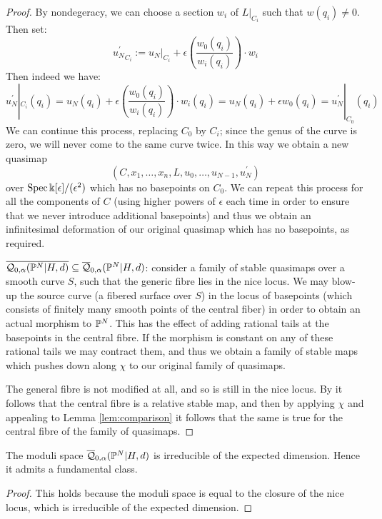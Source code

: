\begin{proof}
By nondegeracy, we can choose a section $w_i$ of $L|_{C_i}$ such that $w(q_i) \neq 0$. Then set:
\begin{equation*} {u_N^\prime}_{C_i} := {u_N}|_{C_i} + \epsilon \left( \frac{w_0(q_i)}{w_i(q_i)} \right) \cdot w_i \end{equation*}
Then indeed we have:
\begin{equation*} {u_N^\prime}|_{C_i}(q_i) = u_N(q_i) + \epsilon \left( \frac{w_0(q_i)}{w_i(q_i)} \right) \cdot w_i(q_i) = u_N(q_i) + \epsilon w_0(q_i) = {u_N^\prime}|_{C_0}(q_i) \end{equation*}
We can continue this process, replacing $C_0$ by $C_i$; since the genus of the curve is zero, we will never come to the same curve twice. In this way we obtain a new quasimap
\begin{equation*} (C,x_1,\ldots,x_n,L,u_0, \ldots, u_{N-1}, u_N^\prime) \end{equation*}
over $\operatorname{Spec} \Bbbk[\epsilon]/(\epsilon^2)$ which has no basepoints on $C_0$. We can repeat this process for all the components of $C$ (using higher powers of $\epsilon$ each time in order to ensure that we never introduce additional basepoints) and thus we obtain an infinitesimal deformation of our original quasimap which has no basepoints, as required.

$\overline{\mathcal Q_{0,\alpha}(\mathbb P^N|H,d)}\subseteq\overline{\mathcal Q}_{0,\alpha}(\mathbb P^N|H,d)$: consider a family of stable quasimaps over a smooth curve $S$, such that the generic fibre lies in the nice locus. We may blow-up the source curve (a fibered surface over $S$) in the locus of basepoints (which consists of finitely many smooth points of the central fiber) in order to obtain an actual morphism to $\mathbb P^N$. This has the effect of adding rational tails at the basepoints in the central fibre. If the morphism is constant on any of these rational tails we may contract them, and thus we obtain a family of stable maps which pushes down along $\chi$ to our original family of quasimaps.

The general fibre is not modified at all, and so is still in the nice locus. By \cite[Lemma 1.9]{Ga} it follows that the central fibre is a relative stable map, and then by applying $\chi$ and appealing to Lemma \ref{lem:comparison} it follows that the same is true for the central fibre of the family of quasimaps.
\end{proof}

\begin{cor} The moduli space $\overline{\mathcal Q}_{0,\alpha}(\mathbb P^N|H,d)$ is irreducible of the expected dimension. Hence it admits a fundamental class. \end{cor}
\begin{proof} This holds because the moduli space is equal to the closure of the nice locus, which is irreducible of the expected dimension. \end{proof}

